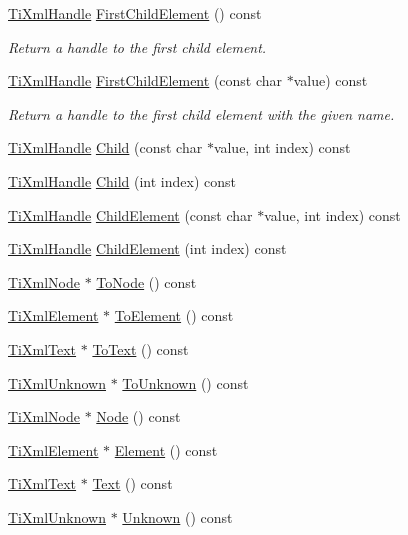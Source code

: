 \begin{DoxyCompactItemize}
\hyperlink{class_ti_xml_handle}{Ti\+Xml\+Handle} \hyperlink{class_ti_xml_handle_af0643f8683f3f2b779b8c9d78c67b2c0}{First\+Child\+Element} () const
\begin{DoxyCompactList}\small\item\em Return a handle to the first child element. \end{DoxyCompactList}\item 
\hyperlink{class_ti_xml_handle}{Ti\+Xml\+Handle} \hyperlink{class_ti_xml_handle_a3eaf2d2d4c087cd8a48da261042e75bc}{First\+Child\+Element} (const char $\ast$value) const
\begin{DoxyCompactList}\small\item\em Return a handle to the first child element with the given name. \end{DoxyCompactList}\item 
\hyperlink{class_ti_xml_handle}{Ti\+Xml\+Handle} \hyperlink{class_ti_xml_handle_a9903b035444ee36450fe00ede403f920}{Child} (const char $\ast$value, int index) const
\item 
\hyperlink{class_ti_xml_handle}{Ti\+Xml\+Handle} \hyperlink{class_ti_xml_handle_a32585942abb28e03eea9c5223f38a659}{Child} (int index) const
\item 
\hyperlink{class_ti_xml_handle}{Ti\+Xml\+Handle} \hyperlink{class_ti_xml_handle_afccc59d8a0daa8c5d78474fbed430ddb}{Child\+Element} (const char $\ast$value, int index) const
\item 
\hyperlink{class_ti_xml_handle}{Ti\+Xml\+Handle} \hyperlink{class_ti_xml_handle_a57a639ab0ac99ff9358f675a1b73049a}{Child\+Element} (int index) const
\item 
\hyperlink{class_ti_xml_node}{Ti\+Xml\+Node} $\ast$ \hyperlink{class_ti_xml_handle_a0e436dea2dd869a859e3a4486023f0fa}{To\+Node} () const
\item 
\hyperlink{class_ti_xml_element}{Ti\+Xml\+Element} $\ast$ \hyperlink{class_ti_xml_handle_a0e3a5333550237d899b1df2b965611a1}{To\+Element} () const
\item 
\hyperlink{class_ti_xml_text}{Ti\+Xml\+Text} $\ast$ \hyperlink{class_ti_xml_handle_abde286bce1d5db0d20ec30e573278cdf}{To\+Text} () const
\item 
\hyperlink{class_ti_xml_unknown}{Ti\+Xml\+Unknown} $\ast$ \hyperlink{class_ti_xml_handle_a450ec91dac1ded02d72eb918d062ad31}{To\+Unknown} () const
\item 
\hyperlink{class_ti_xml_node}{Ti\+Xml\+Node} $\ast$ \hyperlink{class_ti_xml_handle_aec0e3ea58ff98a45cd13507a02e2ca1e}{Node} () const
\item 
\hyperlink{class_ti_xml_element}{Ti\+Xml\+Element} $\ast$ \hyperlink{class_ti_xml_handle_ae9b22d71bf5f69ee5fda28f5ad21f19c}{Element} () const
\item 
\hyperlink{class_ti_xml_text}{Ti\+Xml\+Text} $\ast$ \hyperlink{class_ti_xml_handle_ad3b502c72059421e4dfcc7bda3c392fe}{Text} () const
\item 
\hyperlink{class_ti_xml_unknown}{Ti\+Xml\+Unknown} $\ast$ \hyperlink{class_ti_xml_handle_a12b32f098c7daa5facbc04e9618262c5}{Unknown} () const
\end{DoxyCompactItemize}


